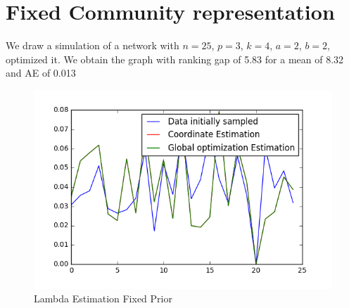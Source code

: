 \documentclass[12pt]{ociamthesis}  %
\begin{document}
	\section{Fixed Community representation}
	
	We draw a simulation of a network with $n = 25$, $ p = 3$, $k = 4$, $a = 2$, $b = 2$, optimized it. We obtain the graph with ranking gap of 5.83 for a mean of 8.32 and AE of 0.013
	\begin{figure}[H]
		\centering
		\includegraphics[width=\textwidth,height=\textheight,keepaspectratio]{LambdaEstimationFixedPrior}
		\caption{Lambda Estimation Fixed Prior}
		\label{label-image9}
	\end{figure}
\end{document}
